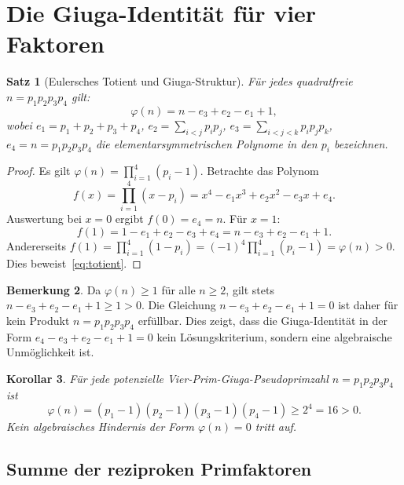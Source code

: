 \documentclass[12pt,a4paper]{amsart}
\newtheorem{theorem}{Satz}[section]
\newtheorem{corollary}[theorem]{Korollar}
\theoremstyle{definition}
\newtheorem{remark}[theorem]{Bemerkung}
\begin{document}
\section{Die Giuga-Identität für vier Faktoren}
\label{sec:identitaet}

\begin{theorem}[Eulersches Totient und Giuga-Struktur]
\label{satz:totient}
Für jedes quadratfreie $n = p_1 p_2 p_3 p_4$ gilt:
\begin{equation}
  \varphi(n) = n - e_3 + e_2 - e_1 + 1,
  \label{eq:totient}
\end{equation}
wobei $e_1 = p_1 + p_2 + p_3 + p_4$, $e_2 = \sum_{i<j} p_i p_j$,
$e_3 = \sum_{i<j<k} p_i p_j p_k$, $e_4 = n = p_1 p_2 p_3 p_4$
die elementarsymmetrischen Polynome in den $p_i$ bezeichnen.
\end{theorem}

\begin{proof}
Es gilt $\varphi(n) = \prod_{i=1}^4 (p_i - 1)$.  Betrachte das Polynom
\[
  f(x) = \prod_{i=1}^4 (x - p_i) = x^4 - e_1 x^3 + e_2 x^2 - e_3 x + e_4.
\]
Auswertung bei $x = 0$ ergibt $f(0) = e_4 = n$.  Für $x = 1$:
\[
  f(1) = 1 - e_1 + e_2 - e_3 + e_4 = n - e_3 + e_2 - e_1 + 1.
\]
Andererseits $f(1) = \prod_{i=1}^4 (1 - p_i) = (-1)^4 \prod_{i=1}^4 (p_i - 1)
= \varphi(n) > 0$.  Dies beweist~\eqref{eq:totient}.
\end{proof}

\begin{remark}
Da $\varphi(n) \ge 1$ für alle $n \ge 2$, gilt stets
$n - e_3 + e_2 - e_1 + 1 \ge 1 > 0$.  Die Gleichung
$n - e_3 + e_2 - e_1 + 1 = 0$ ist daher für kein Produkt $n = p_1 p_2 p_3 p_4$
erfüllbar.  Dies zeigt, dass die Giuga-Identität in der Form
$e_4 - e_3 + e_2 - e_1 + 1 = 0$ kein Lösungskriterium, sondern eine
algebraische Unmöglichkeit ist.
\end{remark}

\begin{corollary}
\label{kor:totient-positive}
Für jede potenzielle Vier-Prim-Giuga-Pseudoprimzahl $n = p_1 p_2 p_3 p_4$ ist
\[
  \varphi(n) = (p_1 - 1)(p_2 - 1)(p_3 - 1)(p_4 - 1) \ge 2^4 = 16 > 0.
\]
Kein algebraisches Hindernis der Form $\varphi(n) = 0$ tritt auf.
\end{corollary}

\subsection{Summe der reziproken Primfaktoren}
\end{document}
